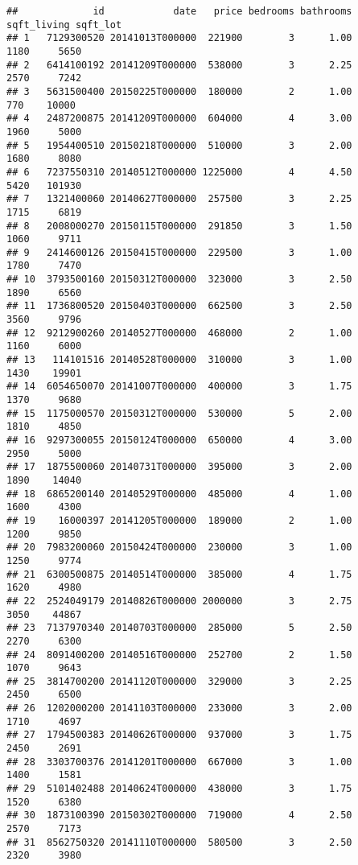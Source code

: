 \documentclass[
]{article}
\begin{document}
\begin{verbatim}
##             id            date   price bedrooms bathrooms sqft_living sqft_lot
## 1   7129300520 20141013T000000  221900        3      1.00        1180     5650
## 2   6414100192 20141209T000000  538000        3      2.25        2570     7242
## 3   5631500400 20150225T000000  180000        2      1.00         770    10000
## 4   2487200875 20141209T000000  604000        4      3.00        1960     5000
## 5   1954400510 20150218T000000  510000        3      2.00        1680     8080
## 6   7237550310 20140512T000000 1225000        4      4.50        5420   101930
## 7   1321400060 20140627T000000  257500        3      2.25        1715     6819
## 8   2008000270 20150115T000000  291850        3      1.50        1060     9711
## 9   2414600126 20150415T000000  229500        3      1.00        1780     7470
## 10  3793500160 20150312T000000  323000        3      2.50        1890     6560
## 11  1736800520 20150403T000000  662500        3      2.50        3560     9796
## 12  9212900260 20140527T000000  468000        2      1.00        1160     6000
## 13   114101516 20140528T000000  310000        3      1.00        1430    19901
## 14  6054650070 20141007T000000  400000        3      1.75        1370     9680
## 15  1175000570 20150312T000000  530000        5      2.00        1810     4850
## 16  9297300055 20150124T000000  650000        4      3.00        2950     5000
## 17  1875500060 20140731T000000  395000        3      2.00        1890    14040
## 18  6865200140 20140529T000000  485000        4      1.00        1600     4300
## 19    16000397 20141205T000000  189000        2      1.00        1200     9850
## 20  7983200060 20150424T000000  230000        3      1.00        1250     9774
## 21  6300500875 20140514T000000  385000        4      1.75        1620     4980
## 22  2524049179 20140826T000000 2000000        3      2.75        3050    44867
## 23  7137970340 20140703T000000  285000        5      2.50        2270     6300
## 24  8091400200 20140516T000000  252700        2      1.50        1070     9643
## 25  3814700200 20141120T000000  329000        3      2.25        2450     6500
## 26  1202000200 20141103T000000  233000        3      2.00        1710     4697
## 27  1794500383 20140626T000000  937000        3      1.75        2450     2691
## 28  3303700376 20141201T000000  667000        3      1.00        1400     1581
## 29  5101402488 20140624T000000  438000        3      1.75        1520     6380
## 30  1873100390 20150302T000000  719000        4      2.50        2570     7173
## 31  8562750320 20141110T000000  580500        3      2.50        2320     3980

\end{verbatim}
\end{document}
